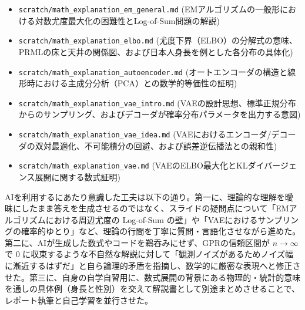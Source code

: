 \documentclass[11pt,a4paper,dvipdfmx]{article}
\numberwithin{equation}{section}
\newenvironment{proofbox}[0]
{
    \begin{mdframed}[
        linecolor=black,
        topline=false,
        bottomline=false,
        rightline=false,
        leftline=true,
        linewidth=2pt,
        innerleftmargin=10pt,
        skipabove=\baselineskip,
        skipbelow=\baselineskip,
    ]
}
{
    \end{mdframed}
}
\begin{document}
\begin{proofbox}
\begin{itemize}
\begin{itemize}
        \item \texttt{scratch/math\_explanation\_em\_general.md} (EMアルゴリズムの一般形における対数尤度最大化の困難性とLog-of-Sum問題の解説)
        \item \texttt{scratch/math\_explanation\_elbo.md} (尤度下界（ELBO）の分解式の意味、PRMLの床と天井の関係図、および日本人身長を例とした各分布の具体化)
        \item \texttt{scratch/math\_explanation\_autoencoder.md} (オートエンコーダの構造と線形時における主成分分析（PCA）との数学的等価性の証明)
        \item \texttt{scratch/math\_explanation\_vae\_intro.md} (VAEの設計思想、標準正規分布からのサンプリング、およびデコーダが確率分布パラメータを出力する意図)
        \item \texttt{scratch/math\_explanation\_vae\_idea.md} (VAEにおけるエンコーダ/デコーダの双対最適化、不可能積分の回避、および誤差逆伝播法との親和性)
        \item \texttt{scratch/math\_explanation\_vae.md} (VAEのELBO最大化とKLダイバージェンス展開に関する数式証明)
    \end{itemize}
\end{itemize}

AIを利用するにあたり意識した工夫は以下の通り。第一に、理論的な理解を曖昧にしたまま答えを生成させるのではなく、スライドの疑問点について「EMアルゴリズムにおける周辺尤度の Log-of-Sum の壁」や「VAEにおけるサンプリングの確率的ゆとり」など、理論の行間を丁寧に質問・言語化させながら進めた。第二に、AIが生成した数式やコードを鵜呑みにせず、GPRの信頼区間が $n \to \infty$ で $0$ に収束するような不自然な解説に対して「観測ノイズがあるためノイズ幅に漸近するはずだ」と自ら論理的矛盾を指摘し、数学的に厳密な表現へと修正させた。第三に、自身の自学自習用に、数式展開の背景にある物理的・統計的意味を通しの具体例（身長と性別）を交えて解説書として別途まとめさせることで、レポート執筆と自己学習を並行させた。
\end{proofbox}
\end{document}
